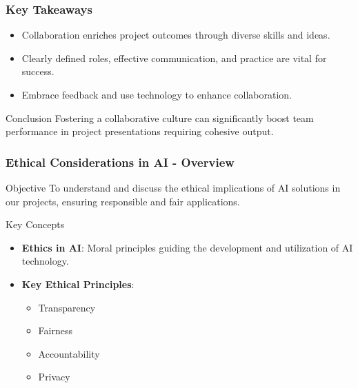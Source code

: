\documentclass[aspectratio=169]{beamer}
\begin{document}
\begin{frame}[fragile]
    \frametitle{Key Takeaways}
    \begin{itemize}
        \item Collaboration enriches project outcomes through diverse skills and ideas.
        \item Clearly defined roles, effective communication, and practice are vital for success.
        \item Embrace feedback and use technology to enhance collaboration.
    \end{itemize}
    \begin{block}{Conclusion}
        Fostering a collaborative culture can significantly boost team performance in project presentations requiring cohesive output.
    \end{block}
\end{frame}

\begin{frame}[fragile]
    \frametitle{Ethical Considerations in AI - Overview}
    \begin{block}{Objective}
        To understand and discuss the ethical implications of AI solutions in our projects, ensuring responsible and fair applications.
    \end{block}
    
    \begin{block}{Key Concepts}
        \begin{itemize}
            \item \textbf{Ethics in AI}: Moral principles guiding the development and utilization of AI technology.
            \item \textbf{Key Ethical Principles}:
                \begin{itemize}
                    \item Transparency
                    \item Fairness
                    \item Accountability
                    \item Privacy
                \end{itemize}
        \end{itemize}
    \end{block}
\end{frame}
\end{document}
